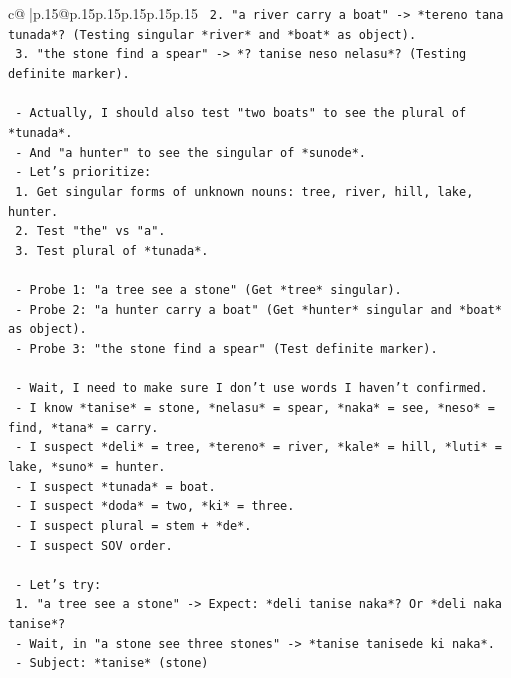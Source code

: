 \documentclass{article}
\begin{document}
{\begin{supertabular}{c@{$\;$}|p{.15\linewidth}@{}p{.15\linewidth}p{.15\linewidth}p{.15\linewidth}p{.15\linewidth}p{.15\linewidth}}
{{{\texttt{      2.  "a river carry a boat" {-}> *tereno tana tunada*? (Testing singular *river* and *boat* as object).} \\
\texttt{      3.  "the stone find a spear" {-}> *? tanise neso nelasu*? (Testing definite marker).} \\
\\ 
\texttt{    {-} Actually, I should also test "two boats" to see the plural of *tunada*.} \\
\texttt{    {-} And "a hunter" to see the singular of *sunode*.} \\
\texttt{    {-} Let's prioritize:} \\
\texttt{      1.  Get singular forms of unknown nouns: tree, river, hill, lake, hunter.} \\
\texttt{      2.  Test "the" vs "a".} \\
\texttt{      3.  Test plural of *tunada*.} \\
\\ 
\texttt{    {-} Probe 1: "a tree see a stone" (Get *tree* singular).} \\
\texttt{    {-} Probe 2: "a hunter carry a boat" (Get *hunter* singular and *boat* as object).} \\
\texttt{    {-} Probe 3: "the stone find a spear" (Test definite marker).} \\
\\ 
\texttt{    {-} Wait, I need to make sure I don't use words I haven't confirmed.} \\
\texttt{    {-} I know *tanise* = stone, *nelasu* = spear, *naka* = see, *neso* = find, *tana* = carry.} \\
\texttt{    {-} I suspect *deli* = tree, *tereno* = river, *kale* = hill, *luti* = lake, *suno* = hunter.} \\
\texttt{    {-} I suspect *tunada* = boat.} \\
\texttt{    {-} I suspect *doda* = two, *ki* = three.} \\
\texttt{    {-} I suspect plural = stem + *de*.} \\
\texttt{    {-} I suspect SOV order.} \\
\\ 
\texttt{    {-} Let's try:} \\
\texttt{      1. "a tree see a stone" {-}> Expect: *deli tanise naka*? Or *deli naka tanise*?} \\
\texttt{         {-} Wait, in "a stone see three stones" {-}> *tanise tanisede ki naka*.} \\
\texttt{         {-} Subject: *tanise* (stone)} \\
}}}
\end{supertabular}}
\end{document}

